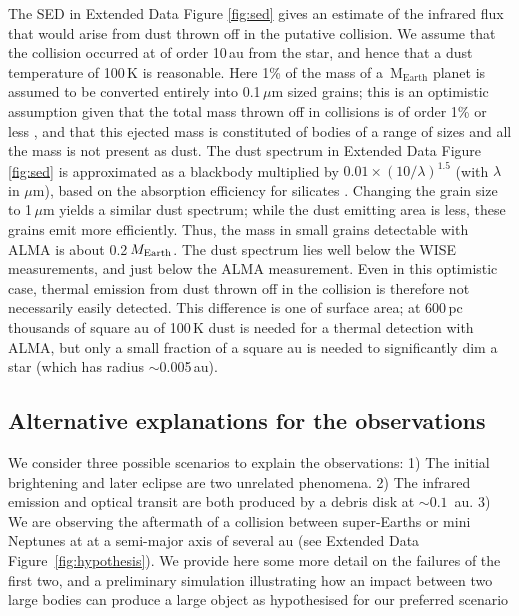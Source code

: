 \documentclass[sn-nature,oneside]{sn-jnl}%
\begin{document}
The SED in Extended Data Figure \ref{fig:sed} gives an estimate of the infrared flux that would arise from dust thrown off in the putative collision.
%
We assume that the collision occurred at of order 10\,au from the star, and hence that a dust temperature of 100\,K is reasonable.
%
Here 1\% of the mass of a \,$\mathrm{M_{Earth}}$ planet is assumed to be converted entirely into 0.1\,$\mu$m sized grains; this is an optimistic assumption given that the total mass thrown off in collisions is of order 1\% or less \citep{2012ApJ...745...79L}, and that this ejected mass is constituted of bodies of a range of sizes and all the mass is not present as dust.
%
The dust spectrum in Extended Data Figure \ref{fig:sed} is approximated as a blackbody multiplied by $0.01 \times (10 / \lambda)^{1.5}$ (with $\lambda$ in $\mu$m), based on the absorption efficiency for silicates \citep{1993ApJ...402..441L}.
%
Changing the grain size to 1\,$\mu$m yields a similar dust spectrum; while the dust emitting area is less, these grains emit more efficiently.
%
Thus, the mass in small grains detectable with ALMA is about 0.2\,$M_{\rm Earth}$.
%
The dust spectrum lies well below the WISE measurements, and just below the ALMA measurement.
%
Even in this optimistic case, thermal emission from dust thrown off in the collision is therefore not necessarily easily detected.
%
This difference is one of surface area; at 600\,pc thousands of square au of 100\,K dust is needed for a thermal detection with ALMA, but only a small fraction of a square au is needed to significantly dim a star (which has radius $\sim$0.005\,au).

\subsection*{Alternative explanations for the observations}

We consider three possible scenarios to explain the observations: 1) The initial brightening and later eclipse are two unrelated phenomena.
%
2) The infrared emission and optical transit are both produced by a debris disk at $\sim0.1$~au.
%
3) We are observing the aftermath of a collision between super-Earths or mini Neptunes at at a semi-major axis of several au (see Extended Data Figure~\ref{fig:hypothesis}).
%
We provide here some more detail on the failures of the first two, and a preliminary simulation illustrating how an impact between two large bodies can produce a large object as hypothesised for our preferred scenario 
\end{document}
